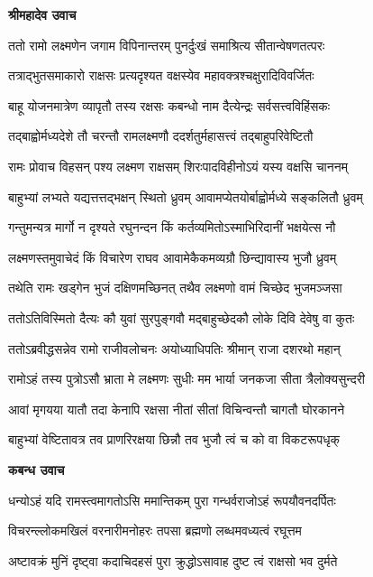 
\textbf{श्रीमहादेव उवाच}

\twolineshloka
{ततो रामो लक्ष्मणेन जगाम विपिनान्तरम्}
{पुनर्दुःखं समाश्रित्य सीतान्वेषणतत्परः} %

\twolineshloka
{तत्राद्भुतसमाकारो राक्षसः प्रत्यदृश्यत}
{वक्षस्येव महावक्त्रश्चक्षुरादिविवर्जितः} %

\twolineshloka
{बाहू योजनमात्रेण व्यापृतौ तस्य रक्षसः}
{कबन्धो नाम दैत्येन्द्रः सर्वसत्त्वविहिंसकः} %

\twolineshloka
{तद्बाह्वोर्मध्यदेशे तौ चरन्तौ रामलक्ष्मणौ}
{ददर्शतुर्महासत्त्वं तद्बाहुपरिवेष्टितौ} %

\twolineshloka
{रामः प्रोवाच विहसन् पश्य लक्ष्मण राक्षसम्}
{शिरःपादविहीनोऽयं यस्य वक्षसि चाननम्} %

\twolineshloka
{बाहुभ्यां लभ्यते यद्यत्तत्तद्भक्षन् स्थितो ध्रुवम्}
{आवामप्येतयोर्बाह्वोर्मध्ये सङ्कलितौ ध्रुवम्} %

\twolineshloka
{गन्तुमन्यत्र मार्गो न दृश्यते रघुनन्दन}
{किं कर्तव्यमितोऽस्माभिरिदानीं भक्षयेत्स नौ} %

\twolineshloka
{लक्ष्मणस्तमुवाचेदं किं विचारेण राघव}
{आवामेकैकमव्यग्रौ छिन्द्यावास्य भुजौ ध्रुवम्} %

\twolineshloka
{तथेति रामः खड्गेन भुजं दक्षिणमच्छिनत्}
{तथैव लक्ष्मणो वामं चिच्छेद भुजमञ्जसा} %

\twolineshloka
{ततोऽतिविस्मितो दैत्यः कौ युवां सुरपुङ्गवौ}
{मद्बाहुच्छेदकौ लोके दिवि देवेषु वा कुतः} %

\twolineshloka
{ततोऽब्रवीद्धसन्नेव रामो राजीवलोचनः}
{अयोध्याधिपतिः श्रीमान् राजा दशरथो महान्} %

\twolineshloka
{रामोऽहं तस्य पुत्रोऽसौ भ्राता मे लक्ष्मणः सुधीः}
{मम भार्या जनकजा सीता त्रैलोक्यसुन्दरी} %

\twolineshloka
{आवां मृगयया यातौ तदा केनापि रक्षसा}
{नीतां सीतां विचिन्वन्तौ चागतौ घोरकानने} %

\twolineshloka
{बाहुभ्यां वेष्टितावत्र तव प्राणरिरक्षया}
{छिन्नौ तव भुजौ त्वं च को वा विकटरूपधृक्} %

\textbf{कबन्ध उवाच}

\twolineshloka
{धन्योऽहं यदि रामस्त्वमागतोऽसि ममान्तिकम्}
{पुरा गन्धर्वराजोऽहं रूपयौवनदर्पितः} %

\twolineshloka
{विचरन्ल्लोकमखिलं वरनारीमनोहरः}
{तपसा ब्रह्मणो लब्धमवध्यत्वं रघूत्तम} %

\twolineshloka
{अष्टावक्रं मुनिं दृष्ट्वा कदाचिदहसं पुरा}
{क्रुद्धोऽसावाह दुष्ट त्वं राक्षसो भव दुर्मते} %

